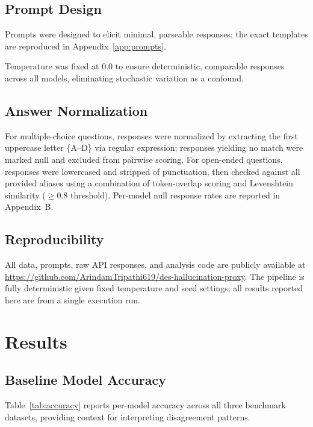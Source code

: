\documentclass[journal]{IEEEtran}
\begin{document}
\subsection{Prompt Design}

Prompts were designed to elicit minimal, parseable responses; the exact
templates are reproduced in Appendix~\ref{app:prompts}.


Temperature was fixed at 0.0 to ensure deterministic, comparable responses
across all models, eliminating stochastic variation as a confound.

\subsection{Answer Normalization}

For multiple-choice questions, responses were normalized by extracting the
first uppercase letter \{A--D\} via regular expression; responses yielding
no match were marked null and excluded from pairwise scoring.
For open-ended questions, responses were lowercased and stripped of
punctuation, then checked against all provided aliases using a combination
of token-overlap scoring and Levenshtein similarity ($\geq$0.8 threshold).
Per-model null response rates are reported in Appendix~B.

\subsection{Reproducibility}

All data, prompts, raw API responses, and analysis code are publicly
available at \url{https://github.com/ArindamTripathi619/des-hallucination-proxy}.
The pipeline is fully deterministic given fixed temperature and seed
settings; all results reported here are from a single execution run.

\section{Results}
\label{sec:results}

\subsection{Baseline Model Accuracy}

Table~\ref{tab:accuracy} reports per-model accuracy across all three
benchmark datasets, providing context for interpreting disagreement patterns.
\begin{table}[htbp]
\caption{Per-Model Accuracy Across Datasets (\%)}
\label{tab:accuracy}
\centering
\resizebox{\columnwidth}{!}{%

}
\end{table}
\end{document}

